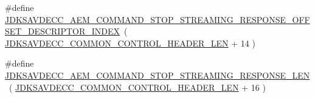 \begin{DoxyCompactItemize}
\item 
\#define \hyperlink{group__command__stop__streaming__response_ga84aa978dc7e20d79b37b091bb19b9a6f}{J\+D\+K\+S\+A\+V\+D\+E\+C\+C\+\_\+\+A\+E\+M\+\_\+\+C\+O\+M\+M\+A\+N\+D\+\_\+\+S\+T\+O\+P\+\_\+\+S\+T\+R\+E\+A\+M\+I\+N\+G\+\_\+\+R\+E\+S\+P\+O\+N\+S\+E\+\_\+\+O\+F\+F\+S\+E\+T\+\_\+\+D\+E\+S\+C\+R\+I\+P\+T\+O\+R\+\_\+\+I\+N\+D\+EX}~( \hyperlink{group__jdksavdecc__avtp__common__control__header_gaae84052886fb1bb42f3bc5f85b741dff}{J\+D\+K\+S\+A\+V\+D\+E\+C\+C\+\_\+\+C\+O\+M\+M\+O\+N\+\_\+\+C\+O\+N\+T\+R\+O\+L\+\_\+\+H\+E\+A\+D\+E\+R\+\_\+\+L\+EN} + 14 )
\item 
\#define \hyperlink{group__command__stop__streaming__response_ga430c0913fa959a9f6e941a9669260286}{J\+D\+K\+S\+A\+V\+D\+E\+C\+C\+\_\+\+A\+E\+M\+\_\+\+C\+O\+M\+M\+A\+N\+D\+\_\+\+S\+T\+O\+P\+\_\+\+S\+T\+R\+E\+A\+M\+I\+N\+G\+\_\+\+R\+E\+S\+P\+O\+N\+S\+E\+\_\+\+L\+EN}~( \hyperlink{group__jdksavdecc__avtp__common__control__header_gaae84052886fb1bb42f3bc5f85b741dff}{J\+D\+K\+S\+A\+V\+D\+E\+C\+C\+\_\+\+C\+O\+M\+M\+O\+N\+\_\+\+C\+O\+N\+T\+R\+O\+L\+\_\+\+H\+E\+A\+D\+E\+R\+\_\+\+L\+EN} + 16 )
\end{DoxyCompactItemize}
